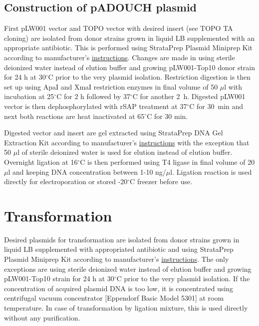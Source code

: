 \subsection{Construction of pADOUCH plasmid}
First pLW001 vector and TOPO vector with desired insert (see TOPO TA cloning) are isolated from donor strains grown in liquid LB supplemented with an appropriate antibiotic.
This is performed using StrataPrep Plasmid Miniprep Kit according to manufacturer's \href{https://www.agilent.com/cs/library/usermanuals/public/400766.pdf}{instructions}.
Changes are made in using sterile deionized water instead of elution buffer and growing pLW001-Top10 donor strain for 24 h at 30$^{\circ}$C prior to the very plasmid isolation.
Restriction digestion is then set up using ApaI and XmaI restriction enzymes in final volume of 50 $\mu$l with incubation at 25$^{\circ}$C for 2 h followed by 37$^{\circ}$C for another 2~h.
Digested pLW001 vector is then dephosphorylated with rSAP treatment at 37$^{\circ}$C for 30~min and next both reactions are heat inactivated at 65$^{\circ}$C for 30 min.

Digested vector and insert are gel extracted using StrataPrep DNA Gel Extraction Kit according to manufacturer's \href{https://www.agilent.com/cs/library/usermanuals/public/400766.pdf}{instructions} with the exception that 50 $\mu$l of sterile deionized water is used for elution instead of elution buffer.
Overnight ligation at 16$^{\circ}$C is then performed using T4 ligase in final volume of 20 $\mu$l and keeping DNA concentration between 1-10 ng/$\mu$l.
Ligation reaction is used directly for electroporation or stored -20$^{\circ}$C freezer before use.

\section{Transformation}
Desired plasmids for transformation are isolated from donor strains grown in liquid LB supplemented with appropriated antibiotic and using StrataPrep Plasmid Miniprep Kit according to manufacturer's \href{https://www.agilent.com/cs/library/usermanuals/public/400766.pdf}{instructions}.
The only exceptions are using sterile deionized water instead of elution buffer and growing pLW001-Top10 strain for 24 h at 30$^{\circ}$C prior to the very plasmid isolation.
If the concentration of acquired plasmid DNA is too low, it is concentrated using centrifugal vacuum concentrator [Eppendorf\textsuperscript{\textregistered} Basic Model 5301] at room temperature.
In case of transformation by ligation mixture, this is used directly without any purification.

